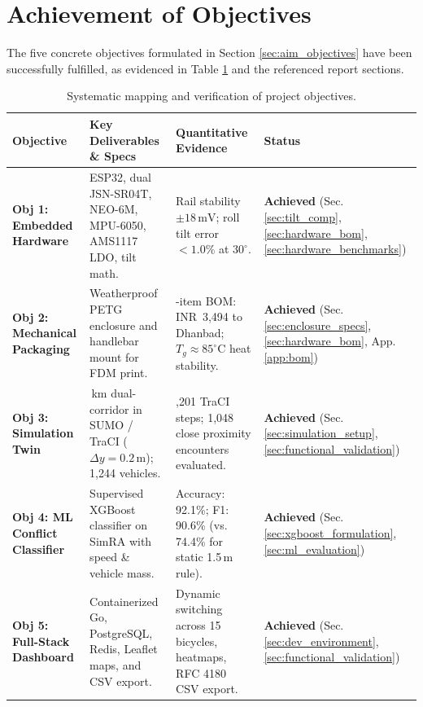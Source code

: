 \section{Achievement of Objectives}
The five concrete objectives formulated in Section \ref{sec:aim_objectives} have been successfully fulfilled, as evidenced in Table \ref{tab:objective_fulfillment} and the referenced report sections.

\begin{table}[h!]
	\centering
	\caption{Systematic mapping and verification of project objectives.}
	\label{tab:objective_fulfillment}
	\setlength{\tabcolsep}{5pt}
	\renewcommand{\arraystretch}{1.25}
	\begin{tabularx}{\textwidth}{|>{\raggedright\arraybackslash\bfseries}p{2.8cm}|>{\raggedright\arraybackslash}X|>{\raggedright\arraybackslash}p{4.2cm}|>{\raggedright\arraybackslash}p{2.6cm}|}
		\hline
		\textbf{Objective} & \textbf{Key Deliverables \& Specs} & \textbf{Quantitative Evidence} & \textbf{Status} \\
		\hline
		\hline
		\textbf{Obj 1:} Embedded Hardware & ESP32, dual JSN-SR04T, NEO-6M, MPU-6050, AMS1117 LDO, tilt math. & Rail stability $\pm 18\,\text{mV}$; roll tilt error $<1.0\%$ at $30^\circ$. & \textbf{Achieved} (Sec. \ref{sec:tilt_comp}, \ref{sec:hardware_bom}, \ref{sec:hardware_benchmarks}) \\
		\hline
		\textbf{Obj 2:} Mechanical Packaging & Weatherproof PETG enclosure and handlebar mount for FDM print. & 14-item BOM: INR~3,494 to Dhanbad; $T_g \approx 85^\circ\text{C}$ heat stability. & \textbf{Achieved} (Sec. \ref{sec:enclosure_specs}, \ref{sec:hardware_bom}, App. \ref{app:bom}) \\
		\hline
		\textbf{Obj 3:} Simulation Twin & 10\,km dual-corridor in SUMO / TraCI ($\Delta y = 0.2\,\text{m}$); 1,244 vehicles. & 7,201 TraCI steps; 1,048 close proximity encounters evaluated. & \textbf{Achieved} (Sec. \ref{sec:simulation_setup}, \ref{sec:functional_validation}) \\
		\hline
		\textbf{Obj 4:} ML Conflict Classifier & Supervised XGBoost classifier on SimRA with speed \& vehicle mass. & Accuracy: 92.1\%; F1: 90.6\% (vs. 74.4\% for static 1.5\,m rule). & \textbf{Achieved} (Sec. \ref{sec:xgboost_formulation}, \ref{sec:ml_evaluation}) \\
		\hline
		\textbf{Obj 5:} Full-Stack Dashboard & Containerized Go, PostgreSQL, Redis, Leaflet maps, and CSV export. & Dynamic switching across 15 bicycles, heatmaps, RFC 4180 CSV export. & \textbf{Achieved} (Sec. \ref{sec:dev_environment}, \ref{sec:functional_validation}) \\
		\hline
	\end{tabularx}
\end{table}


